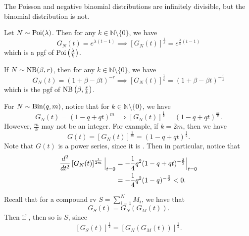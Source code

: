 \documentclass[notoc,notitlepage]{tufte-book}
\begin{document}
\begin{eg}
  The Poisson and negative binomial distributions are infinitely divisible, but the binomial distribution is not.
\end{eg}

\begin{solution}
  Let $N \sim \operatorname{Poi}(\lambda)$. Then for any $k \in \mathbb{N} \setminus \{ 0 \}$, we have
  \begin{equation*}
    G_N(t) = e^{\lambda( t - 1 )} \implies \left[ G_N(t) \right]^{\frac{1}{k}} = e^{\frac{\lambda}{k} ( t - 1 )}
  \end{equation*}
  which is a pgf of $\operatorname{Poi} \left( \frac{\lambda}{k} \right)$.

  If $N \sim \operatorname{NB}(\beta, r)$, then for any $k \in \mathbb{N} \setminus \{ 0 \}$, we have
  \begin{equation*}
    G_N(t) = (1 + \beta - \beta t)^{-r} \implies \left[ G_N(t) \right]^{\frac{1}{k}} = ( 1 + \beta - \beta t )^{-\frac{r}{k}}
  \end{equation*}
  which is the pgf of $\operatorname{NB}\left(\beta, \frac{r}{k} \right)$.

  For $N \sim \operatorname{Bin}(q, m)$, notice that for $k \in \mathbb{N} \setminus \{ 0 \}$, we have
  \begin{equation*}
    G_N(t) = (1 - q + qt)^m \implies \left[ G_N(t) \right]^{\frac{1}{k}} = ( 1 - q + qt )^{\frac{m}{k}}.
  \end{equation*}
  However, $\frac{m}{k}$ may not be an integer. For example, if $k = 2m$, then we have
  \begin{equation*}
    G(t) = \left[ G_N(t) \right]^{\frac{1}{m}} = ( 1 - q + qt )^{\frac{1}{2}}.
  \end{equation*}
  Note that $G(t)$ is a power series, since it is . Then in particular, notice that
  \begin{align*}
    \frac{d^2}{dt^2} \left[ G_N(t) \right]^{\frac{1}{2m}}\Big|_{t = 0}^{} 
      &= - \frac{1}{4} q^2 ( 1 - q + qt )^{-\frac{3}{2}} \Big|_{t = 0}^{} \\
      &= - \frac{1}{4} q^2 ( 1 - q )^{-\frac{3}{2}} < 0.
  \end{align*}
\end{solution}

\begin{eg}
  Recall that for a compound rv $S = \sum_{i=1}^{N} M_i$, we have that
  \begin{equation*}
    G_S(t) = G_N( G_M(t) ).
  \end{equation*}
  Then if , then so is $S$, since
  \begin{equation*}
    \left[ G_S(t) \right]^{\frac{1}{k}} = \left[ G_N( G_M(t) ) \right]^{\frac{1}{k}}.
  \end{equation*}
\end{eg}
\end{document}
